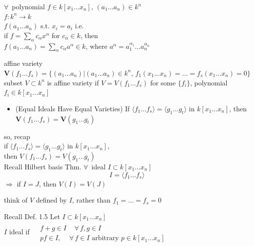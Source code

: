 $\forall \, $ polynomial $f\in k[x_1 \dots x_n ]$, $(a_1 \dots a_n) \in k^n$ \\
\phantom{ \quad } $f: k^n \to k$ \\
\phantom{ \quad } $f(a_1 \dots a_n)$ s.t. $x_i = a_i$ i.e. \\

if $f= \sum_{\alpha} c_{\alpha} x^{\alpha}$ for $c_{\alpha} \in k$, then  \\
\phantom{ \quad } $f(a_1 \dots a_n) =\sum_{\alpha} c_{\alpha}a^{\alpha} \in k$, where $a^{\alpha} = a_1^{\alpha_1} \dots a_n^{\alpha_n}$

\begin{definition}[4.1]
affine variety $\mathbf{V}(f_1 \dots f_s) = \lbrace ( a_1 \dots a_n) | (a_1 \dots a_n) \in k^n, \, f_1(x_1 \dots x_n) = \dots = f_s(x_1 \dots x_n) = 0 \rbrace$ \\
subset $V\subset k^n$ is affine variety if $V = V(f_1 \dots f_s)$ for some $\lbrace f_i \rbrace$, polynomial $f_i \in k[x_1 \dots x_n]$
\end{definition}

\begin{itemize}
  \item (Equal Ideals Have Equal Varieties) If $\langle f_1 \dots f_s \rangle = \langle g_1 \dots g_t \rangle$ in $k[x_1 \dots x_n]$, then $\mathbf{V}(f_1 \dots f_s) = \mathbf{V}(g_1 \dots g_t)$
\end{itemize}

so, recap \\
if $\langle f_1 \dots f_s \rangle = \langle g_1 \dots g_t \rangle $ in $k[x_1 \dots x_n]$, \\
then $V(f_1 \dots f_s) = V(g_1 \dots g_t)$   \\

Recall Hilbert basis Thm. $\forall \, $ ideal $I \subset k[x_1 \dots x_n]$ 
\[
I= \langle f_1 \dots f_s \rangle
\]
$\Longrightarrow $ if $I=J$, then $V(I) = V(J)$

think of $V$ defined by $I$, rather than $f_1 = \dots = f_s =0$


Recall Def. 1.5 Let $I\subset k[x_1 \dots x_n]$ \\
$I$ ideal if $\begin{aligned} & \quad \\
  & f + g \in I  \quad \, \forall \, f,g \in I \\
  & pf \in I, \quad \, \forall \, f \in I \text{ arbitrary } p \in k[x_1 \dots x_n]
\end{aligned}$


